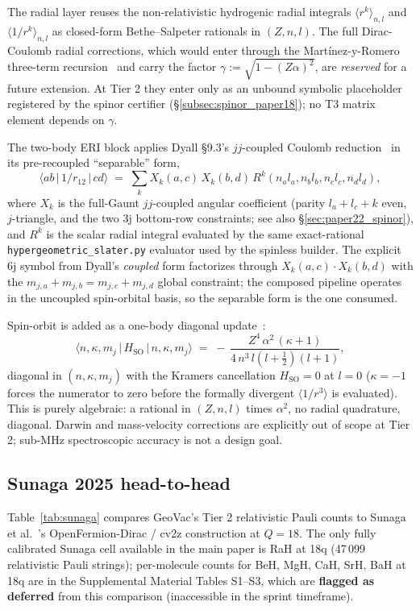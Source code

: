 \documentclass[aps,pra,twocolumn,superscriptaddress,longbibliography]{revtex4-2}
\begin{document}
The radial layer reuses the non-relativistic hydrogenic radial
integrals $\langle r^k \rangle_{n,l}$ and $\langle 1/r^k \rangle_{n,l}$
as closed-form Bethe--Salpeter rationals in $(Z, n, l)$. The full
Dirac-Coulomb radial corrections, which would enter through the
Martínez-y-Romero three-term recursion~\cite{MartinezYRomero2004} and
carry the factor $\gamma := \sqrt{1 - (Z\alpha)^2}$, are \emph{reserved}
for a future extension. At Tier 2 they enter only as an unbound
symbolic placeholder registered by the spinor certifier
(\S\ref{subsec:spinor_paper18}); no T3 matrix element depends on $\gamma$.

The two-body ERI block applies Dyall \S 9.3's $jj$-coupled Coulomb
reduction~\cite{Dyall} in its pre-recoupled ``separable'' form,
\[
  \langle a b \,|\, 1/r_{12} \,|\, c d \rangle
  \;=\; \sum_k X_k(a, c)\, X_k(b, d)\, R^k(n_a l_a, n_b l_b, n_c l_c, n_d l_d),
\]
where $X_k$ is the full-Gaunt $jj$-coupled angular coefficient
(parity $l_a + l_c + k$ even, $j$-triangle, and the two 3j bottom-row
constraints; see also \S\ref{sec:paper22_spinor}), and $R^k$ is the
scalar radial integral evaluated by the same exact-rational
\texttt{hypergeometric\_slater.py} evaluator used by the spinless
builder. The explicit 6j symbol from Dyall's \emph{coupled} form
factorizes through $X_k(a,c) \cdot X_k(b,d)$ with the
$m_{j,a} + m_{j,b} = m_{j,c} + m_{j,d}$ global constraint; the
composed pipeline operates in the uncoupled spin-orbital basis, so
the separable form is the one consumed.

Spin-orbit is added as a one-body diagonal update~\cite{BreitPauli}:
\[
  \langle n, \kappa, m_j \,|\, H_{\mathrm{SO}} \,|\, n, \kappa, m_j \rangle
  \;=\; -\,\frac{Z^4\,\alpha^2\,(\kappa+1)}{4\,n^3\, l(l+\tfrac{1}{2})(l+1)},
\]
diagonal in $(n, \kappa, m_j)$ with the Kramers cancellation
$H_{\mathrm{SO}} = 0$ at $l = 0$ ($\kappa = -1$ forces the numerator
to zero before the formally divergent $\langle 1/r^3\rangle$ is
evaluated). This is purely algebraic: a rational in $(Z, n, l)$
times $\alpha^2$, no radial quadrature, diagonal. Darwin and
mass-velocity corrections are explicitly out of scope at Tier 2;
sub-MHz spectroscopic accuracy is not a design goal.

\subsection{Sunaga 2025 head-to-head}
\label{subsec:sunaga}

Table~\ref{tab:sunaga} compares GeoVac's Tier 2 relativistic Pauli
counts to Sunaga et al.~\cite{Sunaga2025}'s
OpenFermion-Dirac / cv2z construction at $Q = 18$. The only fully
calibrated Sunaga cell available in the main paper is RaH at 18q
(47\,099 relativistic Pauli strings); per-molecule counts for BeH,
MgH, CaH, SrH, BaH at 18q are in the Supplemental Material Tables
S1--S3, which are \textbf{flagged as deferred} from this comparison
(inaccessible in the sprint timeframe).
\end{document}

